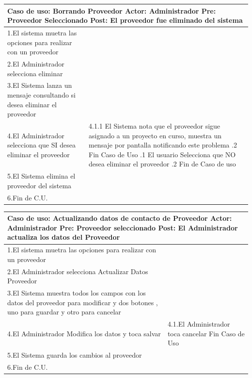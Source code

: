 \begin{longtable}{| p{} | p{} |} 
    \hline
    \multicolumn{2}{|p{16cm}|}{
        \textbf{Caso de uso:} Borrando Proveedor \newline
        \textbf{Actor:} Administrador\newline
        \textbf{Pre:}  Proveedor Seleccionado\newline
        \textbf{Post:} El proveedor fue eliminado del sistema
    }\\
    \hline
    1.El sistema  muetra las opciones para realizar con un proveedor & \\
    \hline
    2.El Administrador selecciona eliminar& \\
    \hline
    3.El Sistema lanza un mensaje consultando si desea eliminar el proveedor &  \\
    \hline
    4.El Administrador selecciona que SI desea eliminar el proveedor & 4.1.1 El Sistema nota que el proveedor sigue asignado a un proyecto en curso, muestra un mensaje por pantalla notificando este problema \newline 4.1.2 Fin Caso de Uso \newline 4.2.1 El usuario Selecciona que NO desea eliminar el proveedor \newline4.2.2 Fin de Caso de uso\\
    \hline
    5.El Sistema elimina el proveedor del sistema &  \\
    \hline
    6.Fin de C.U.& \\
    \hline
\end{longtable}
\begin{longtable}{|p{}|p{}|}
    \hline
    \multicolumn{2}{|p{16cm}|}{
        \textbf{Caso de uso:} Actualizando datos de contacto de Proveedor \newline
        \textbf{Actor:} Administrador\newline
        \textbf{Pre:}  Proveedor seleccionado\newline
        \textbf{Post:} El Administrador actualiza los datos del Proveedor
    }\\
    \hline
    1.El sistema  muetra las opciones para realizar con un proveedor & \\
    \hline
    2.El Administrador selecciona Actualizar Datos Proveedor&   \\
    \hline
    3.El Sistema muestra todos los campos con los datos del proveedor para modificar y dos botones , uno para guardar y otro para cancelar&  \\
    \hline
    4.El Administrador Modifica los datos y toca salvar & 4.1.El Administrador toca cancelar \newline 4.2 Fin Caso de Uso \\
    \hline
    5.El Sistema guarda los cambios al proveedor &  \\
    \hline
    6.Fin de C.U.& \\
    \hline
\end{longtable}

